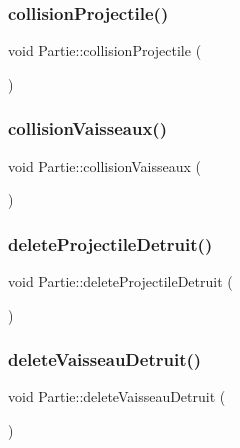 \subsubsection{\texorpdfstring{collision\+Projectile()}{collisionProjectile()}}
{\footnotesize\ttfamily void Partie\+::collision\+Projectile (\begin{DoxyParamCaption}{ }\end{DoxyParamCaption})}

\mbox{\label{class_partie_a97ce349fac7e91f3cd8cc2a547a35239}} 
\subsubsection{\texorpdfstring{collision\+Vaisseaux()}{collisionVaisseaux()}}
{\footnotesize\ttfamily void Partie\+::collision\+Vaisseaux (\begin{DoxyParamCaption}{ }\end{DoxyParamCaption})}

\mbox{\label{class_partie_a88b2fa21d16b97fc120ea4d0e35208af}} 
\subsubsection{\texorpdfstring{delete\+Projectile\+Detruit()}{deleteProjectileDetruit()}}
{\footnotesize\ttfamily void Partie\+::delete\+Projectile\+Detruit (\begin{DoxyParamCaption}{ }\end{DoxyParamCaption})}

\mbox{\label{class_partie_ae3caf4ac1e50ac945783b1a0d79a85c7}} 
\subsubsection{\texorpdfstring{delete\+Vaisseau\+Detruit()}{deleteVaisseauDetruit()}}
{\footnotesize\ttfamily void Partie\+::delete\+Vaisseau\+Detruit (\begin{DoxyParamCaption}{ }\end{DoxyParamCaption})}

